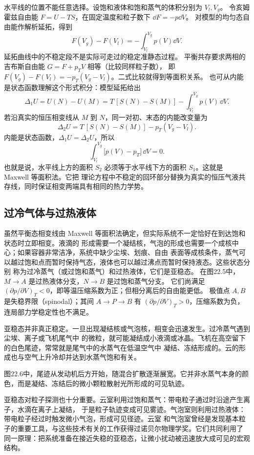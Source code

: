 \maxwellAreaFigure
{}

水平线的位置不能任意选择。设饱和液体和饱和蒸气的体积分别为 $V_l,V_g$。
令亥姆霍兹自由能 $F=U-TS$，在固定温度和粒子数下 $\dd F=-p\dd V$。
对模型的均匀态自由能作解析延拓，得到
\[F(V_g)-F(V_l)=-\int_{V_l}^{V_g}p(V)\dd V.\]
延拓曲线中的不稳定段不是实际可走过的稳定准静态过程。
平衡共存要求两相的吉布斯自由能 $G=F+p_TV$ 相等（比较同样粒子数），
即 $F(V_g)-F(V_l)=-p_T(V_g-V_l)$。二式比较就得到等面积关系。
也可从内能是状态函数理解这个形式积分：模型延拓给出
\[
  \Delta_1U=U(N)-U(M)
  =T\,[S(N)-S(M)]-\int_{V_l}^{V_g}p(V)\,\dd V.
\]
若沿真实的恒压相变线从 $M$ 到 $N$，同一对初、末态的内能改变量为
\[
  \Delta_2U=T\,[S(N)-S(M)]-p_T(V_g-V_l).
\]
内能是状态函数，$\Delta_1U=\Delta_2U$，所以
\begin{equation}
  \boxed{\int_{V_l}^{V_g}\bigl[p(V)-p_T\bigr]\,\dd V=0}.
  \tag{22.6}
\end{equation}
也就是说，水平线上方的面积 $S_2$ 必须等于水平线下方的面积 $S_1$。这就是 Maxwell 等面积法。它把
理论方程中不稳定的回环部分替换为真实的恒压气液共存线，同时保证相变两端具有相同的热力学势。

\subsection*{过冷气体与过热液体}

虽然平衡态相变线由 Maxwell 等面积法确定，但实际系统不一定恰好在到达饱和状态时立即相变。液滴的
形成需要一个凝结核，气泡的形成也需要一个成核中心；如果容器非常洁净，系统中缺少尘埃、划痕、自由
表面等成核条件，蒸气可以越过饱和点而暂时保持气态，液体也可以越过沸点而暂时保持液态。这些状态分别
称为过冷蒸气（或过饱和蒸气）和过热液体，它们是亚稳态。
在图22.5中，$M\to A$ 是过热液体分支，$N\to B$ 是过饱和蒸气分支。
它们尚满足 $(\partial p/\partial V)_T<0$，即等温压缩系数为正；但相分离后的自由能更低。
极值点 $A,B$ 是失稳界限（spinodal）；其间 $A\to P\to B$ 有
$(\partial p/\partial V)_T>0$，压缩系数为负，连局部力学稳定性也不满足。

亚稳态并非真正稳定。一旦出现凝结核或气泡核，相变会迅速发生。过冷蒸气遇到尘埃、离子或飞机尾气中
的微粒，就可能凝结成小液滴或冰晶。飞机在高空留下的白色尾迹，常常就是尾气中的水蒸气在低温空气中
凝结、冻结形成的。云的形成也与空气上升冷却并达到水蒸气饱和有关。

图22.6中，尾迹从发动机后方开始，随混合扩散逐渐展宽。它并非水蒸气本身的颜色，而是凝结、冻结后的微小颗粒散射光所形成的可见轨迹。
\contrailFigure
{}

亚稳态对粒子探测也十分重要。云室利用过饱和蒸气：带电粒子通过时沿途产生离子，水滴在离子上凝结，
于是粒子轨迹变成可见雾迹。气泡室则利用过热液体：带电粒子经过时触发微小气泡，形成可见径迹。云室
和气泡室曾经是发现基本粒子的重要工具，与这些技术有关的工作获得过诺贝尔物理学奖。它们共同利用了
同一原理：把系统准备在接近失稳的亚稳态，让微小扰动被迅速放大成可见的宏观结构。


